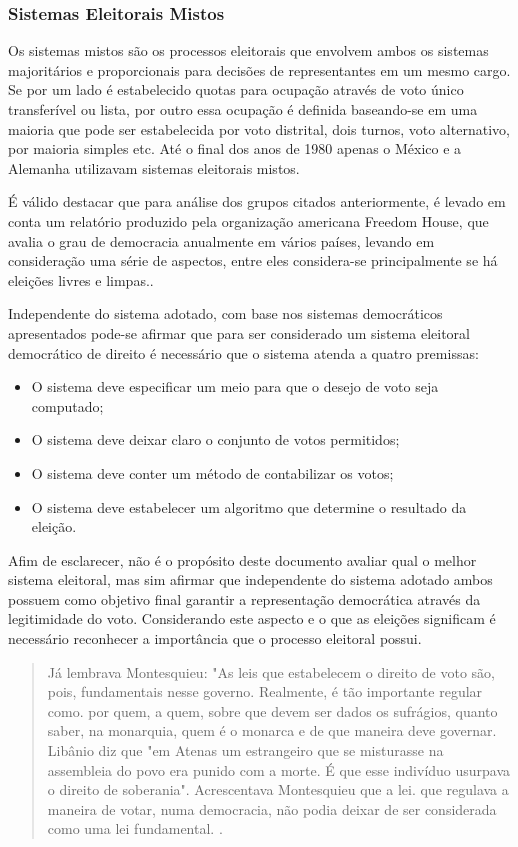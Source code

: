 \subsubsection{Sistemas Eleitorais Mistos}
Os sistemas mistos são os processos eleitorais que envolvem ambos os sistemas 
majoritários e proporcionais para decisões de representantes em um mesmo cargo.
Se por um lado é estabelecido quotas para ocupação através de voto único transferível
ou lista, por outro essa ocupação é definida baseando-se em uma maioria que pode
ser estabelecida por voto distrital, dois turnos, voto alternativo, por maioria 
simples etc. Até o final dos anos de 1980 apenas o México e a Alemanha utilizavam
sistemas eleitorais mistos.\par 
É válido destacar que para análise dos grupos citados anteriormente,
é levado em conta um relatório produzido pela organização americana Freedom House,
que avalia o grau de democracia anualmente em vários países, levando em consideração
uma série de aspectos, entre eles considera-se principalmente se há eleições 
livres e limpas.\cite{puddington2011freedom}. \par
Independente do sistema adotado, com base nos sistemas democráticos apresentados
pode-se afirmar que para ser considerado um sistema eleitoral democrático de direito
é necessário que o sistema atenda a quatro premissas:
\begin{itemize}
  \item O sistema deve especificar um meio para que o desejo de voto seja computado;
  \item O sistema deve deixar claro o conjunto de votos permitidos;
  \item O sistema deve conter um método de contabilizar os votos;
  \item O sistema deve estabelecer um algoritmo que determine o resultado da eleição.
\end{itemize} \par
Afim de esclarecer, não é o propósito deste documento avaliar qual o melhor 
sistema eleitoral, mas sim afirmar que independente 
do sistema adotado ambos possuem como objetivo final garantir a representação
democrática através da legitimidade do voto. Considerando este aspecto e 
o que as eleições significam é necessário reconhecer a importância que 
o processo eleitoral possui.
\begin{quote}
Já lembrava Montesquieu: "As leis que estabelecem o direito de voto são, pois,
fundamentais nesse governo. Realmente, é tão importante regular como. por quem, 
a quem, sobre que devem ser dados os sufrágios, quanto saber, na monarquia, 
quem é o monarca e de que maneira deve governar. Libânio diz que "em Atenas um 
estrangeiro que se misturasse na assembleia do povo era punido com a morte.
É que esse indivíduo usurpava o direito de soberania". Acrescentava Montesquieu
que a lei. que regulava a maneira de votar, numa democracia, não podia deixar 
de ser considerada como uma lei fundamental. \cite[Pág. 173]{sobrinho1958eleiccao}.
\end{quote}\par
